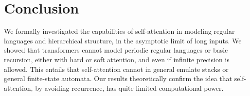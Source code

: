 \documentclass[11pt,a4paper]{article}
\begin{document}
\section{Conclusion}
We formally investigated the capabilities of self-attention in modeling regular languages and hierarchical structure, in the asymptotic limit of long inputs.
We showed that transformers cannot model periodic regular languages or basic recursion, either with hard or soft attention, and even if infinite precision is allowed. %
This entails that self-attention cannot in general emulate stacks or general finite-state automata.
Our results theoretically confirm the idea that self-attention, by avoiding recurrence, has quite limited computational power.





\end{document}
